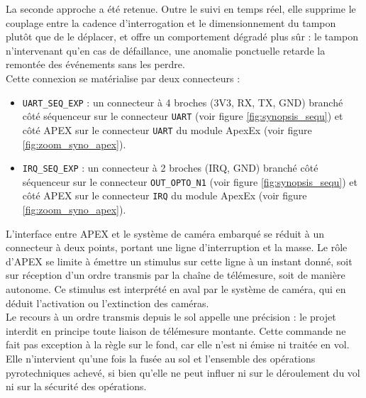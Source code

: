 La seconde approche a été retenue. Outre le suivi en temps réel, elle supprime le couplage entre la cadence d'interrogation et le
dimensionnement du tampon plutôt que de le déplacer, et offre un comportement dégradé plus sûr : le tampon n'intervenant qu'en cas de
défaillance, une anomalie ponctuelle retarde la remontée des événements sans les perdre. \\

Cette connexion se matérialise par deux connecteurs :
\begin{itemize}
    \item \verb|UART_SEQ_EXP| : un connecteur à 4 broches (3V3, RX, TX, GND) branché côté séquenceur sur le connecteur \verb|UART|
    (voir figure \ref{fig:synopsis_sequ}) et côté \gls{APEX} sur le connecteur \verb|UART| du module ApexEx (voir figure
    \ref{fig:zoom_syno_apex}).

    \item \verb|IRQ_SEQ_EXP| : un connecteur à 2 broches (IRQ, GND) branché côté séquenceur sur le connecteur \verb|OUT_OPTO_N1|
    (voir figure \ref{fig:synopsis_sequ}) et côté \gls{APEX} sur le connecteur \verb|IRQ| du module ApexEx (voir figure
    \ref{fig:zoom_syno_apex}).
\end{itemize}

\newpage


L'interface entre \gls{APEX} et le système de caméra embarqué se réduit à un connecteur à deux points, portant une ligne
d'interruption et la masse. Le rôle d'\gls{APEX} se limite à émettre un stimulus sur cette ligne à un instant donné, soit sur
réception d'un ordre transmis par la chaîne de télémesure, soit de manière autonome. Ce stimulus est interprété en aval par le
système de caméra, qui en déduit l'activation ou l'extinction des caméras.\\

Le recours à un ordre transmis depuis le sol appelle une précision : le projet interdit en principe toute liaison de télémesure
montante. Cette commande ne fait pas exception à la règle sur le fond, car elle n'est ni émise ni traitée en vol. Elle n'intervient
qu'une fois la fusée au sol et l'ensemble des opérations pyrotechniques achevé, si bien qu'elle ne peut influer ni sur le
déroulement du vol ni sur la sécurité des opérations.

\label{subsubsubsec:apex_pb_bus}

